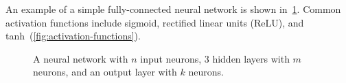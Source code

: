 \documentclass[ppgc,diss,english]{iiufrgs}
\def\nstyle{int(\lay<\Nnodlen?min(2,\lay):3)} %
\begin{document}
An example of a simple fully-connected neural network is shown in~\cref{fig:neural-network}.
Common activation functions include sigmoid, rectified linear units (ReLU), and tanh~(\cref{fig:activation-functions}).

\begin{figure}[ht]
\caption{A neural network with $n$ input neurons, $3$ hidden layers with $m$ neurons, and an output layer with $k$ neurons.}
\vspace{\baselineskip}
\centering
{}
\label{fig:neural-network}
\end{figure}
\end{document}
